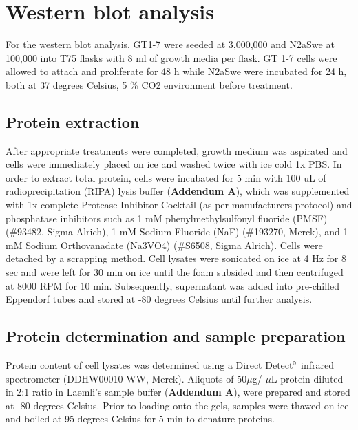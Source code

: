 \section{Western blot analysis}
For the western blot analysis, GT1-7 were seeded at 3,000,000 and N2aSwe at 100,000 into T75 flasks with 8 ml of growth media per flask. GT 1-7 cells were allowed to attach and proliferate for 48 h while N2aSwe were incubated for 24 h, both at 37 degrees Celsius, 5 \% CO2 environment before treatment.

\subsection{Protein extraction}
After appropriate treatments were completed, growth medium was aspirated and cells were immediately placed on ice and washed twice with ice cold 1x PBS. In order to extract total protein, cells were incubated for 5 min with 100 uL of radioprecipitation (RIPA) lysis buffer (\textbf{Addendum A}), which was supplemented with 1x complete Protease Inhibitor Cocktail (as per manufacturers protocol) and phosphatase inhibitors such as 1 mM phenylmethylsulfonyl fluoride (PMSF) (\#93482, Sigma Alrich), 1 mM Sodium Fluoride (NaF) (\#193270, Merck), and 1 mM Sodium Orthovanadate (Na3VO4) (\#S6508, Sigma Alrich). Cells were detached by a scrapping method. Cell lysates were sonicated on ice at 4 Hz for 8 sec and were left for 30 min on ice until the foam subsided and then centrifuged at 8000 RPM for 10 min. Subsequently, supernatant was added into pre-chilled Eppendorf tubes and stored at -80 degrees Celsius until further analysis.

\subsection{Protein determination and sample preparation}
Protein content of cell lysates was determined using a Direct Detect${\textsuperscript{\tiny{\textregistered}}}$ infrared spectrometer (DDHW00010-WW, Merck). Aliquots of 50$\mu$g/ $\mu$L protein diluted in 2:1 ratio in Laemli’s sample buffer (\textbf{Addendum A}), were prepared and stored at -80 degrees Celsius. Prior to loading onto the gels, samples were thawed on ice and boiled at 95 degrees Celsius for 5 min to denature proteins.

